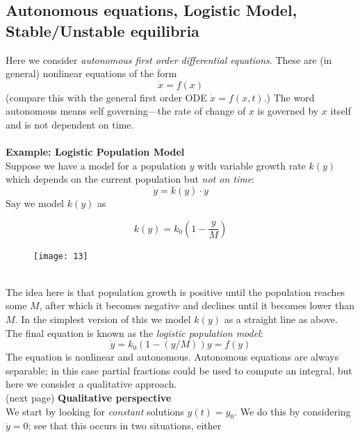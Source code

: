 \documentclass{report}
\begin{document}
\subsection{Autonomous equations, Logistic Model,\\Stable/Unstable equilibria}
Here we consider \textit{autonomous first order differential equations}. These are (in general) nonlinear equations
of the form
\begin{equation*}
\dot{x}=f(x)
\end{equation*}
(compare this with the general first order ODE $\dot{x}=f(x,t)$.) The word autonomous means self governing---the
rate of change of $x$ is governed by $x$ itself and is not dependent on time.\\
\vspace{1mm}\\
\textbf{Example: Logistic Population Model}\\
Suppose we have a model for a population $y$ with variable growth rate $k(y)$ which depends on the current
population but \textit{not on time}:
\begin{equation*}
\dot{y}=k(y)\cdot y
\end{equation*}
Say we model $k(y)$ as
\begin{figure}[h]
\begin{equation*}
k(y)=k_0\left(1-\frac{y}{M}\right)
\end{equation*}
\begin{center}
\texttt{[image: 13]}\\
\end{center}
\end{figure}\\
The idea here is that population growth is positive until the population reaches some $M$, after which it becomes 
negative and declines until it becomes lower than $M$.
In the simplest version of this we model $k(y)$ as a straight line as above. The final equation is known as the 
\textit{logistic population model}:
\begin{equation*}
\dot{y}=k_0(1-(y/M))y=f(y)
\end{equation*}
The equation is nonlinear and autonomous. 
Autonomous equations are always separable; in this case partial fractions could be used to compute an
integral, but here we consider a qualitative approach.\\
(next page)
\newpage
\noindent\textbf{Qualitative perspective}\\
We start by looking for \textit{constant} solutions
$y(t)=y_0$. We do this by considering $\dot{y}=0$; see that this occurs in two situations, either
\end{document}
